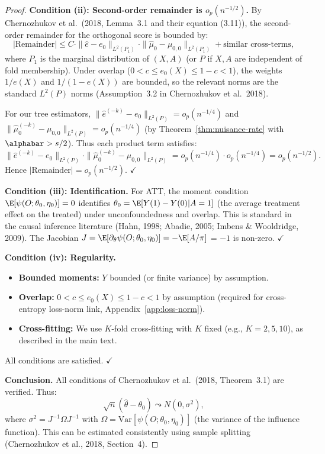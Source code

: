 \documentclass[12pt]{article}
\begin{document}
\begin{proof}
\noindent\textbf{Condition (ii): Second-order remainder is $o_p(n^{-1/2})$.}
By Chernozhukov et al.\ (2018, Lemma~3.1 and their equation (3.11)), the second-order remainder for the orthogonal score is bounded by:
\[
|\text{Remainder}| \le C \cdot \|\hat{e} - e_0\|_{L^2(P_1)} \cdot \|\hat{\mu}_0 - \mu_{0,0}\|_{L^2(P_1)} + \text{similar cross-terms},
\]
where $P_1$ is the marginal distribution of $(X, A)$ (or $P$ if $X, A$ are independent of fold membership). Under overlap ($0 < c \le e_0(X) \le 1-c < 1$), the weights $1/e(X)$ and $1/(1-e(X))$ are bounded, so the relevant norms are the standard $L^2(P)$ norms (Assumption~3.2 in Chernozhukov et al.\ 2018).

For our tree estimators, $\|\hat{e}^{(-k)} - e_0\|_{L^2(P)} = o_p(n^{-1/4})$ and $\|\hat{\mu}_0^{(-k)} - \mu_{0,0}\|_{L^2(P)} = o_p(n^{-1/4})$ (by Theorem~\ref{thm:nuisance-rate} with $\alphabar > s/2$). Thus each product term satisfies:
\[
\|\hat{e}^{(-k)} - e_0\|_{L^2(P)} \cdot \|\hat{\mu}_0^{(-k)} - \mu_{0,0}\|_{L^2(P)} = o_p(n^{-1/4}) \cdot o_p(n^{-1/4}) = o_p(n^{-1/2}).
\]
Hence $|\text{Remainder}| = o_p(n^{-1/2})$. $\checkmark$

\noindent\textbf{Condition (iii): Identification.}
For ATT, the moment condition $\E[\psi(O; \theta_0, \eta_0)] = 0$ identifies $\theta_0 = \E[Y(1) - Y(0) | A = 1]$ (the average treatment effect on the treated) under unconfoundedness and overlap. This is standard in the causal inference literature (Hahn, 1998; Abadie, 2005; Imbens \& Wooldridge, 2009). The Jacobian $J = \E[\partial_\theta \psi(O; \theta_0, \eta_0)] = -\E[A/\pi]$ = $-1$ is non-zero. $\checkmark$

\noindent\textbf{Condition (iv): Regularity.}
\begin{itemize}
\item \textbf{Bounded moments:} $Y$ bounded (or finite variance) by assumption.
\item \textbf{Overlap:} $0 < c \le e_0(X) \le 1-c < 1$ by assumption (required for cross-entropy loss-norm link, Appendix~\ref{app:loss-norm}).
\item \textbf{Cross-fitting:} We use $K$-fold cross-fitting with $K$ fixed (e.g., $K = 2, 5, 10$), as described in the main text.
\end{itemize}
All conditions are satisfied. $\checkmark$

\noindent\textbf{Conclusion.}
All conditions of Chernozhukov et al.\ (2018, Theorem~3.1) are verified. Thus:
\[
\sqrt{n}(\hat\theta - \theta_0) \leadsto N(0, \sigma^2),
\]
where $\sigma^2 = J^{-1} \Omega J^{-1}$ with $\Omega = \text{Var}[\psi(O; \theta_0, \eta_0)]$ (the variance of the influence function). This can be estimated consistently using sample splitting (Chernozhukov et al., 2018, Section~4).
\end{proof}
\end{document}
